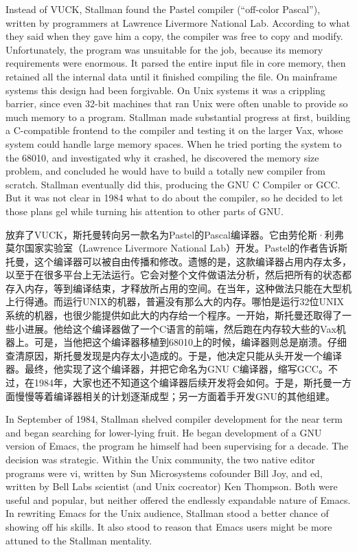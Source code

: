 \ifdefined\vtwo
\ifdefined\eng
Instead of VUCK, Stallman found the Pastel compiler (``off-color Pascal''), written by programmers at Lawrence Livermore National Lab. According to what they said when they gave him a copy, the compiler was free to copy and modify. Unfortunately, the program was unsuitable for the job, because its memory requirements were enormous.  It parsed the entire input file in core memory, then retained all the internal data until it finished compiling the file. On mainframe systems this design had been forgivable. On Unix systems it was a crippling barrier, since even 32-bit machines that ran Unix were often unable to provide so much memory to a program. Stallman made substantial progress at first, building a C-compatible frontend to the compiler and testing it on the larger Vax, whose system could handle large memory spaces. When he tried porting the system to the 68010, and investigated why it crashed,  he discovered the memory size problem, and concluded he would have to build a totally new compiler from scratch.  Stallman eventually did this, producing the GNU C Compiler or GCC.  But it was not clear in 1984 what to do about the compiler, so he decided to let those plans gel while turning his attention to other parts of GNU.
\fi

\ifdefined\chs
放弃了VUCK，斯托曼转向另一款名为Pastel的Pascal编译器。它由劳伦斯·利弗莫尔国家实验室（Lawrence Livermore National Lab）开发。Pastel的作者告诉斯托曼，这个编译器可以被自由传播和修改。遗憾的是，这款编译器占用内存太多，以至于在很多平台上无法运行。它会对整个文件做语法分析，然后把所有的状态都存入内存，等到编译结束，才释放所占用的空间。在当年，这种做法只能在大型机上行得通。而运行UNIX的机器，普遍没有那么大的内存。哪怕是运行32位UNIX系统的机器，也很少能提供如此大的内存给一个程序。一开始，斯托曼还取得了一些小进展。他给这个编译器做了一个C语言的前端，然后跑在内存较大些的Vax机器上。可是，当他把这个编译器移植到68010上的时候，编译器则总是崩溃。仔细查清原因，斯托曼发现是内存太小造成的。于是，他决定只能从头开发一个编译器。最终，他实现了这个编译器，并把它命名为GNU C编译器，缩写GCC。不过，在1984年，大家也还不知道这个编译器后续开发将会如何。于是，斯托曼一方面慢慢等着编译器相关的计划逐渐成型；另一方面着手开发GNU的其他组建。
\fi
\fi

\ifdefined\eng
\ifdefined\vone
In September of 1984, Stallman shelved compiler development for the near term and began searching for lower-lying fruit. He began development of a GNU version of Emacs, the program he himself had been supervising for a decade. The decision was strategic. Within the Unix community, the two native editor programs were vi, written by Sun Microsystems cofounder Bill Joy, and ed, written by Bell Labs scientist (and Unix cocreator) Ken Thompson. Both were useful and popular, but neither offered the endlessly expandable nature of Emacs. In rewriting Emacs for the Unix audience, Stallman stood a better chance of showing off his skills. It also stood to reason that Emacs users might be more attuned to the Stallman mentality.
\fi

